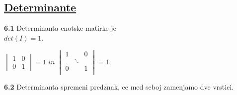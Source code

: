 \documentclass{article}
\begin{document}
\begin{multicols}{2}
\section{\underline{Determinante}}

\textbf{6.1} Determinanta enotske matirke je\\ $det(I) = 1$.
\begin{center}
	\begin{math}
		\begin{vmatrix}
			1 & 0 \\
			0 & 1
		\end{vmatrix}
		= 1\; in\;
		\begin{vmatrix}
			1 &        & 0 \\
			  & \ddots &   \\
			0 &        & 1 \\
		\end{vmatrix}
		= 1.
	\end{math}
\end{center}

\textbf{6.2} Determinanta spremeni predznak, ce med seboj zamenjamo dve vrstici.


\end{multicols}
\end{document}

